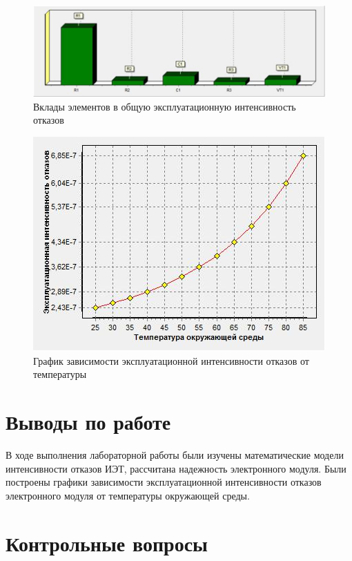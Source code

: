 \documentclass[a4paper,14pt]{article}
\begin{document}
\begin{figure}[H]
	\centering
	\includegraphics[width=0.7\linewidth]{image/graf}
	\caption{Вклады элементов в общую эксплуатационную интенсивность отказов}
	\label{fig:graf}
\end{figure}


\begin{figure}[H]
	\centering
	\includegraphics[width=0.6\linewidth]{image/temp}
	\caption{График зависимости эксплуатационной интенсивности отказов от температуры}
	\label{fig:temp}
\end{figure}



\section{Выводы по работе}

В ходе выполнения лабораторной работы были изучены математические модели интенсивности отказов ИЭТ, рассчитана надежность электронного модуля. 
Были построены графики зависимости эксплуатационной интенсивности отказов электронного модуля от температуры окружающей среды.

\section{Контрольные вопросы}
\end{document}
